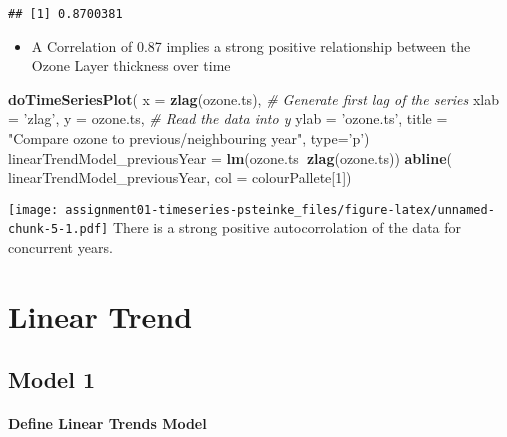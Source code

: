 \documentclass[]{article}
\newenvironment{Shaded}{\begin{snugshade}}{\end{snugshade}}
\newcommand{\CommentTok}[1]{\textcolor[rgb]{0.56,0.35,0.01}{\textit{#1}}}
\newcommand{\DataTypeTok}[1]{\textcolor[rgb]{0.13,0.29,0.53}{#1}}
\newcommand{\DecValTok}[1]{\textcolor[rgb]{0.00,0.00,0.81}{#1}}
\newcommand{\KeywordTok}[1]{\textcolor[rgb]{0.13,0.29,0.53}{\textbf{#1}}}
\newcommand{\NormalTok}[1]{#1}
\newcommand{\OperatorTok}[1]{\textcolor[rgb]{0.81,0.36,0.00}{\textbf{#1}}}
\newcommand{\StringTok}[1]{\textcolor[rgb]{0.31,0.60,0.02}{#1}}
\providecommand{\tightlist}{%
  \setlength{\itemsep}{0pt}\setlength{\parskip}{0pt}}
\let\oldparagraph\paragraph
\renewcommand{\paragraph}[1]{\oldparagraph{#1}\mbox{}}
\begin{document}
\begin{verbatim}
## [1] 0.8700381
\end{verbatim}

\begin{itemize}
\tightlist
\item
  A Correlation of 0.87 implies a strong positive relationship between
  the Ozone Layer thickness over time
\end{itemize}

\begin{Shaded}
\begin{Highlighting}[]
\KeywordTok{doTimeSeriesPlot}\NormalTok{(}
  \DataTypeTok{x =} \KeywordTok{zlag}\NormalTok{(ozone.ts), }\CommentTok{# Generate first lag of the series}
  \DataTypeTok{xlab =} \StringTok{'zlag'}\NormalTok{,}
  \DataTypeTok{y =}\NormalTok{ ozone.ts, }\CommentTok{# Read the data into y}
  \DataTypeTok{ylab =} \StringTok{'ozone.ts'}\NormalTok{,}
  \DataTypeTok{title =} \StringTok{"Compare ozone to previous/neighbouring year"}\NormalTok{,}
  \DataTypeTok{type=}\StringTok{'p'}\NormalTok{)}
\NormalTok{linearTrendModel_previousYear =}
\StringTok{  }\KeywordTok{lm}\NormalTok{(ozone.ts}\OperatorTok{~}\KeywordTok{zlag}\NormalTok{(ozone.ts))}
\KeywordTok{abline}\NormalTok{(}
\NormalTok{  linearTrendModel_previousYear,}
  \DataTypeTok{col =}\NormalTok{ colourPallete[}\DecValTok{1}\NormalTok{])}
\end{Highlighting}
\end{Shaded}

\texttt{[image: assignment01-timeseries-psteinke\_files/figure-latex/unnamed-chunk-5-1.pdf]}
There is a strong positive autocorrolation of the data for concurrent
years.

\hypertarget{linear-trend}{%
\section{Linear Trend}\label{linear-trend}}

\hypertarget{model-1}{%
\subsection{Model 1}\label{model-1}}

\hypertarget{define-linear-trends-model}{%
\paragraph{Define Linear Trends
Model}\label{define-linear-trends-model}}
\end{document}
